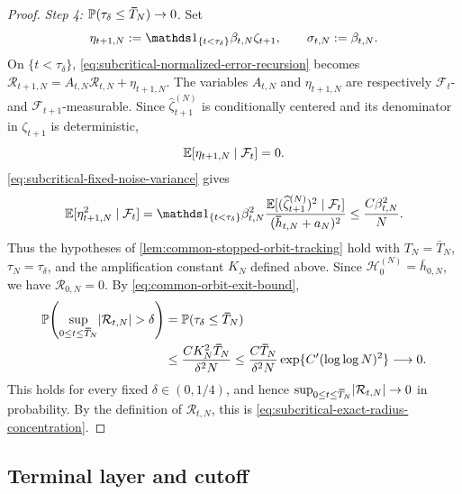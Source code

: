 \documentclass[11pt,reqno,a4paper]{article}
\newcommand{\Pp}{\P}
\newcommand{\Ee}{\E}
\begin{document}
\begin{proof}
  \emph{Step 4: $\Pp(\tau_\delta\leq\bar T_N)\to0$.}
  Set
  \begin{equation*}
    \eta_{t+1,N}
    :=
    \one_{\{t<\tau_\delta\}}\beta_{t,N}\zeta_{t+1},
    \qquad
    \sigma_{t,N}:=\beta_{t,N}.
  \end{equation*}
  On $\{t<\tau_\delta\}$,
  \cref{eq:subcritical-normalized-error-recursion} becomes
  $\mathcal R_{t+1,N}=A_{t,N}\mathcal R_{t,N}+\eta_{t+1,N}$.
  The variables $A_{t,N}$ and $\eta_{t+1,N}$ are respectively
  $\mathcal F_t$- and $\mathcal F_{t+1}$-measurable. Since
  $\widehat\zeta_{t+1}^{(N)}$ is conditionally centered and its denominator in
  $\zeta_{t+1}$ is deterministic,
  \begin{equation*}
    \Ee[\eta_{t+1,N}\mid\mathcal F_t]=0.
  \end{equation*}
  \cref{eq:subcritical-fixed-noise-variance} gives
  \begin{equation*}
    \Ee[\eta_{t+1,N}^2\mid\mathcal F_t]
    =
    \one_{\{t<\tau_\delta\}}\beta_{t,N}^2
    \frac{
      \Ee[(\widehat\zeta_{t+1}^{(N)})^2\mid\mathcal F_t]
    }{
      (\bar h_{t,N}+a_N)^2
    }
    \leq
    \frac{C\beta_{t,N}^2}{N}.
  \end{equation*}
  Thus the hypotheses of \cref{lem:common-stopped-orbit-tracking} hold with
  $T_N=\bar T_N$, $\tau_N=\tau_\delta$, and the amplification constant $K_N$
  defined above. Since $\mathscr H_0^{(N)}=\bar h_{0,N}$, we have
  $\mathcal R_{0,N}=0$. By \cref{eq:common-orbit-exit-bound},
  \begin{align*}
    \Pp\left(
      \sup_{0\leq t\leq\bar T_N}\abs{\mathcal R_{t,N}}>\delta
    \right)
    &=
    \Pp(\tau_\delta\leq\bar T_N)
    \\
    &\leq
    \frac{CK_N^2\bar T_N}{\delta^2N}
    \leq
    \frac{C\bar T_N}{\delta^2N}
    \exp\{C'(\log\log N)^2\}
    \longrightarrow0.
  \end{align*}
  This holds for every fixed $\delta\in(0,1/4)$, and hence
  $\sup_{0\leq t\leq\bar T_N}\abs{\mathcal R_{t,N}}\to0$ in probability. By
  the definition of $\mathcal R_{t,N}$, this is
  \cref{eq:subcritical-exact-radius-concentration}.
\end{proof}

\subsection{Terminal layer and cutoff}
\label{subsec:subcritical-terminal-cutoff}
\end{document}
